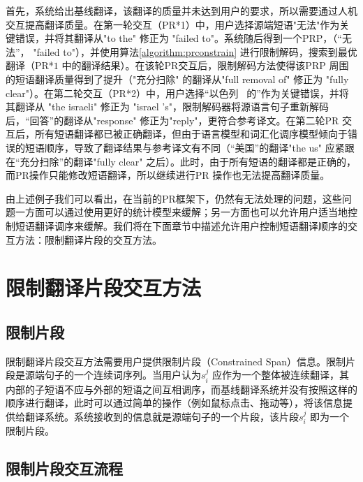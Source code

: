 \documentclass[master, winfont]{njuthesis}
\begin{document}
首先，系统给出基线翻译，该翻译的质量并未达到用户的要求，所以需要通过人机交互提高翻译质量。在第一轮交互（PR*1）中，用户选择源端短语"无法"作为关键错误，并将其翻译从"to the" 修正为 "failed to"。系统随后得到一个PRP，（“无法”， "failed to"），并使用算法\ref{algorithm:prconstrain} 进行限制解码，搜索到最优翻译（PR*$1$ 中的翻译结果）。在该轮PR交互后，限制解码方法使得该PRP 周围的短语翻译质量得到了提升（"充分扫除" 的翻译从"full removal of" 修正为 "fully clear"）。在第二轮交互（PR*2）中，用户选择“以色列~ 的”作为关键错误，并将其翻译从 "the israeli" 修正为 "israel 's"，限制解码器将源语言句子重新解码后，“回答”的翻译从"response" 修正为"reply"，更符合参考译文。在第二轮PR 交互后，所有短语翻译都已被正确翻译，但由于语言模型和词汇化调序模型倾向于错误的短语顺序，导致了翻译结果与参考译文有不同（“美国”的翻译"the us" 应紧跟在“充分扫除”的翻译"fully clear" 之后）。此时，由于所有短语的翻译都是正确的，而PR操作只能修改短语翻译，所以继续进行PR 操作也无法提高翻译质量。

由上述例子我们可以看出，在当前的PR框架下，仍然有无法处理的问题，这些问题一方面可以通过使用更好的统计模型来缓解；另一方面也可以允许用户适当地控制短语翻译调序来缓解。我们将在下面章节中描述允许用户控制短语翻译顺序的交互方法：限制翻译片段的交互方法。
\section{限制翻译片段交互方法}
\label{section:contrainSpan}
\subsection{限制片段}
限制翻译片段交互方法需要用户提供限制片段（Constrained Span）信息。限制片段是源端句子的一个连续词序列。当用户认为$s_i^j$ 应作为一个整体被连续翻译，其内部的子短语不应与外部的短语之间互相调序，而基线翻译系统并没有按照这样的顺序进行翻译，此时可以通过简单的操作（例如鼠标点击、拖动等），将该信息提供给翻译系统。系统接收到的信息就是源端句子的一个片段，该片段$s_i^j$ 即为一个限制片段。

\subsection{限制片段交互流程}
\end{document}

